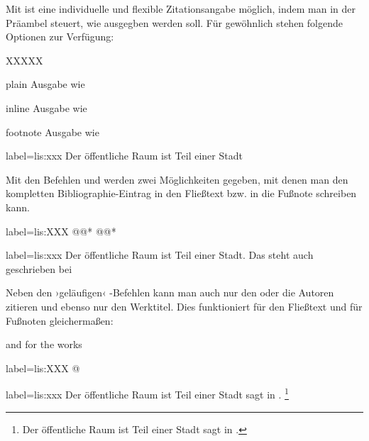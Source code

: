 Mit   ist eine individuelle und flexible Zitationsangabe möglich,
indem man in der Präambel steuert,
wie  ausgegben werden soll.
Für gewöhnlich stehen folgende Optionen zur Verfügung:
\begin{labeling}{XXXXX}
	\item[plain] Ausgabe wie 
	\item[inline]Ausgabe wie 
	\item[footnote]Ausgabe wie 
\end{labeling}

\begin{lfgwexample}{label={lis:xxx}}
Der öffentliche Raum ist Teil einer Stadt \autocite{Osland2016} 
\end{lfgwexample}

Mit den Befehlen  und  werden zwei Möglichkeiten gegeben,
mit denen man den kompletten Bibliographie-Eintrag in den Fließtext bzw. in die Fußnote schreiben kann.
\begin{lfgwcode}{label={lis:XXX}}
\fullcite*@@*
\footfullcite*@@*
\end{lfgwcode} 

\begin{lfgwexample}{label={lis:xxx}}
Der öffentliche Raum ist Teil einer Stadt.
Das steht auch geschrieben bei 
\end{lfgwexample}



Neben den ›geläufigen‹  -Befehlen kann man auch nur den oder die Autoren zitieren 
und ebenso nur den Werktitel.
Dies funktioniert für den Fließtext und für Fußnoten gleichermaßen:
  and for the works 
\begin{lfgwcode}{label={lis:XXX}}
\citetitle*@%
\end{lfgwcode} 

\begin{lfgwexample}{label={lis:xxx}}
Der öffentliche Raum ist Teil einer Stadt sagt \citeauthor{Osland2016} in .
\footnote{Der öffentliche Raum ist Teil einer Stadt sagt \citeauthor{Osland2016} in .}
\end{lfgwexample}


